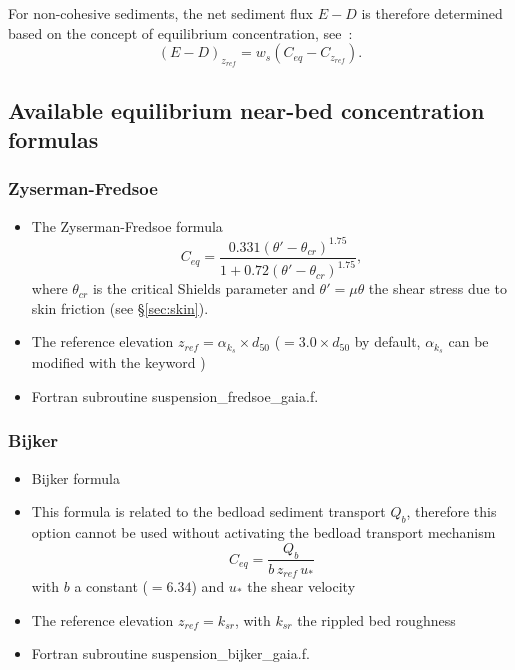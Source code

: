 For non-cohesive sediments, the net sediment flux $E-D$ is therefore determined based on the concept of equilibrium concentration, see~\cite{CelikRodi}:
\begin{equation}\label{eq:CelikRodi}
\left(E-D \right)_{z_{ref}} = w_s \left(C_{eq} - C_{z_{ref}}\right).
\end{equation}

\subsection{Available equilibrium near-bed concentration formulas}\label{sec:concform}
\subsubsection{Zyserman-Fredsoe}
\begin{itemize}
\item The Zyserman-Fredsoe formula~\cite{Zyserman} 
\begin{equation*}
C_{eq} =\frac{0.331(\theta'-\theta_{cr})^{1.75}}{1+0.72(\theta'-\theta_{cr})^{1.75}},
\end{equation*}
where $\theta_{cr}$ is the critical Shields parameter and $\theta'= \mu\theta$ the shear stress due to skin friction (see \S\ref{sec:skin}).
\item The reference elevation $z_{ref}=\alpha_{k_s}\times d_{50}$ ($=3.0\times d_{50}$ by default, $\alpha_{k_s}$ can be modified with the keyword )
\item Fortran subroutine {\ttfamily suspension\_fredsoe\_gaia.f}.
\end{itemize}

\subsubsection{Bijker}
\begin{itemize}
\item Bijker formula 
\item This formula is related to the bedload sediment transport $Q_b$, therefore this option cannot be used without activating the bedload transport mechanism 
\begin{equation*}
C_{eq} =\frac{Q_b}{b\,z_{ref}\,u_*}
\end{equation*}
with $b$ a constant ($=6.34$) and $u_*$ the shear velocity
\item The reference elevation $z_{ref}=k_{sr}$, with $k_{sr}$ the rippled bed roughness
\item Fortran subroutine {\ttfamily suspension\_bijker\_gaia.f}.
\end{itemize}

